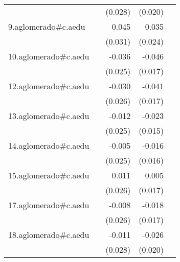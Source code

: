 {\begin{longtable}{l*{4}{D{.}{.}{-1}}}
            &                     &     (0.028)         &     (0.020)         &                     \\
\addlinespace
9.aglomerado#c.aedu&                     &       0.045         &       0.035         &                     \\
            &                     &     (0.031)         &     (0.024)         &                     \\
\addlinespace
10.aglomerado#c.aedu&                     &      -0.036         &      -0.046\sym{**} &                     \\
            &                     &     (0.025)         &     (0.017)         &                     \\
\addlinespace
12.aglomerado#c.aedu&                     &      -0.030         &      -0.041\sym{*}  &                     \\
            &                     &     (0.026)         &     (0.017)         &                     \\
\addlinespace
13.aglomerado#c.aedu&                     &      -0.012         &      -0.023         &                     \\
            &                     &     (0.025)         &     (0.015)         &                     \\
\addlinespace
14.aglomerado#c.aedu&                     &      -0.005         &      -0.016         &                     \\
            &                     &     (0.025)         &     (0.016)         &                     \\
\addlinespace
15.aglomerado#c.aedu&                     &       0.011         &       0.005         &                     \\
            &                     &     (0.026)         &     (0.017)         &                     \\
\addlinespace
17.aglomerado#c.aedu&                     &      -0.008         &      -0.018         &                     \\
            &                     &     (0.026)         &     (0.017)         &                     \\
\addlinespace
18.aglomerado#c.aedu&                     &      -0.011         &      -0.026         &                     \\
            &                     &     (0.028)         &     (0.020)         &                     \\

\end{longtable}}
